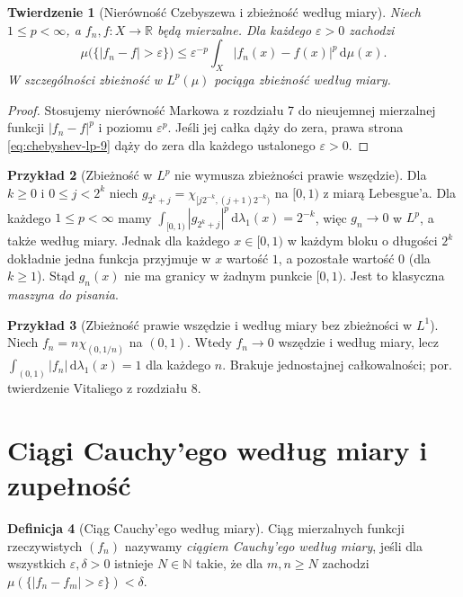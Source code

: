 \documentclass[11pt,a4paper,oneside]{book}
\numberwithin{equation}{chapter}
\theoremstyle{plain}
\newtheorem{twierdzenie}{Twierdzenie}[chapter]
\theoremstyle{definition}
\newtheorem{definicja}[twierdzenie]{Definicja}
\newtheorem{przyklad}[twierdzenie]{Przykład}
\theoremstyle{remark}
\begin{document}
\begin{twierdzenie}[Nierówność Czebyszewa i zbieżność według miary]
\label{thm:lp-implies-measure-9}
Niech $1\le p<\infty$, a $f_n,f:X\to\mathbb R$
będą mierzalne. Dla każdego $\varepsilon>0$ zachodzi
\begin{equation}\label{eq:chebyshev-lp-9}
\mu\bigl(\{|f_n-f|>\varepsilon\}\bigr)
\le\varepsilon^{-p}
\int_X|f_n(x)-f(x)|^p\,\mathrm d\mu(x).
\end{equation}
W szczególności zbieżność w $L^p(\mu)$ pociąga
zbieżność według miary.
\end{twierdzenie}
\begin{proof}
Stosujemy nierówność Markowa z rozdziału 7
do nieujemnej mierzalnej funkcji $|f_n-f|^p$
i poziomu $\varepsilon^p$. Jeśli jej całka dąży
do zera, prawa strona \eqref{eq:chebyshev-lp-9}
dąży do zera dla każdego ustalonego $\varepsilon>0$.
\end{proof}

\begin{przyklad}[Zbieżność w $L^p$ nie wymusza zbieżności prawie wszędzie]
\label{ex:typewriter-lp-9}
Dla $k\ge0$ i $0\le j<2^k$ niech
$g_{2^k+j}=\chi_{[j2^{-k},(j+1)2^{-k})}$
na $[0,1)$ z miarą Lebesgue'a. Dla każdego
$1\le p<\infty$ mamy
$\int_{[0,1)}|g_{2^k+j}|^p\,\mathrm d\lambda_1(x)=2^{-k}$,
więc $g_n\to0$ w $L^p$, a także według miary.
Jednak dla każdego $x\in[0,1)$ w każdym bloku o długości
$2^k$ dokładnie jedna funkcja przyjmuje w $x$
wartość $1$, a pozostałe wartość $0$ (dla $k\ge1$).
Stąd $g_n(x)$ nie ma granicy w żadnym punkcie $[0,1)$.
Jest to klasyczna \emph{maszyna do pisania}.
\end{przyklad}

\begin{przyklad}[Zbieżność prawie wszędzie i według miary bez zbieżności w $L^1$]
Niech $f_n=n\chi_{(0,1/n)}$ na $(0,1)$.
Wtedy $f_n\to0$ wszędzie i według miary, lecz
$\int_{(0,1)}|f_n|\,\mathrm d\lambda_1(x)=1$
dla każdego $n$. Brakuje jednostajnej całkowalności;
por. twierdzenie Vitaliego z rozdziału 8.
\end{przyklad}

\section{Ciągi Cauchy'ego według miary i zupełność}

\begin{definicja}[Ciąg Cauchy'ego według miary]
\label{def:cauchy-measure-9}
Ciąg mierzalnych funkcji rzeczywistych $(f_n)$
nazywamy \emph{ciągiem Cauchy'ego według miary}, jeśli
dla wszystkich $\varepsilon,\delta>0$ istnieje
$N\in\mathbb N$ takie, że dla $m,n\ge N$
zachodzi $\mu(\{|f_n-f_m|>\varepsilon\})<\delta$.
\end{definicja}
\end{document}
